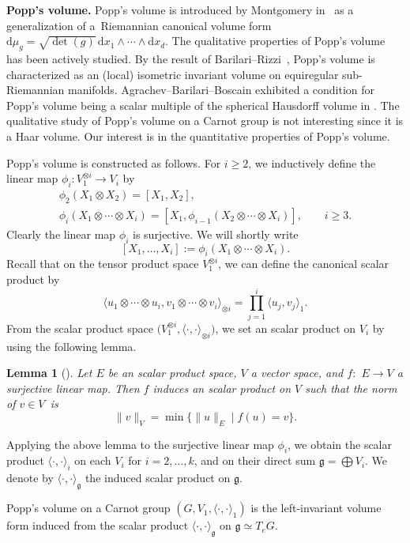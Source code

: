 \documentclass[pdftex]{sigma}
\numberwithin{equation}{section}
\newtheorem{Lemma}[Theorem]{Lemma}
\newcommand{\g}{\mathfrak{g}}
\begin{document}
{\bf Popp's volume.}
Popp's volume is introduced by Montgomery in~\cite{mon} as a gene\-ra\-li\-za\-tion of a~Riemannian canonical volume form $\mathrm{d}\mu_g=\sqrt{\det(g)}\,\mathrm{d}x_1\wedge\cdots\wedge \mathrm{d}x_d$.
The qualitative properties of Popp's volume has been actively studied.
By the result of Barilari--Rizzi~\cite{bar},
Popp's volume is characterized as an (local) isometric invariant volume on equiregular sub-Riemannian manifolds.
Agrachev--Barilari--Boscain exhibited a condition for Popp's volume being a scalar multiple of the spherical Hausdorff volume in \cite{agr2}.
The qualitative study of Popp's volume on a Carnot group is not interesting since it is a Haar volume.
Our interest is in the quantitative properties of Popp's volume.

Popp's volume is constructed as follows.
For $i\geq 2$,
we inductively define the linear map $\phi_i\colon V_1^{\otimes i}\to V_i$ by
\begin{gather*}
\phi_2(X_1\otimes X_2)=[X_1,X_2],
\\
\phi_i(X_1\otimes \cdots \otimes X_i)=[X_1,\phi_{i-1}(X_2\otimes \cdots\otimes X_i)],\qquad i\geq 3.
\end{gather*}
Clearly the linear map $\phi_i$ is surjective.
We will shortly write
\[
[X_1,\dots,X_i]:=\phi_i(X_1\otimes\cdots\otimes X_i).
\]
Recall that on the tensor product space $V_1^{\otimes i}$,
we can define the canonical scalar product by
\[
\langle u_1\otimes\cdots\otimes u_i,v_1\otimes \cdots\otimes v_i\rangle_{\otimes i}=\prod_{j=1}^i\langle u_j,v_j\rangle_1.
\]
From the scalar product space $\big(V_1^{\otimes i},\langle\cdot,\cdot\rangle_{\otimes i}\big)$,
we set an scalar product on $V_i$ by using the following lemma.

\begin{Lemma}[{\cite[Lemma~20.3]{agr}}]
 Let $E$ be an scalar product space,
 $V$ a vector space,
 and $f{:}$ $E\to V$ a surjective linear map.
 Then $f$ induces an scalar product on $V$ such that the norm of $v\in V$~is
 \[
 \|v\|_{V}=\min\{\|u\|_E\mid f(u)=v\}.
 \]
\end{Lemma}

Applying the above lemma to the surjective linear map $\phi_i$,
we obtain the scalar product $\langle\cdot,\cdot\rangle_i$ on each $V_i$ for $i=2,\dots,k$,
and on their direct sum $\g=\bigoplus V_i$.
We denote by $\langle\cdot,\cdot\rangle_{\g}$ the induced scalar product on $\g$.
\begin{Definition}\label{defpopp}
 Popp's volume on a Carnot group $(G,V_1,\langle\cdot,\cdot\rangle_1)$ is the left-invariant volume form induced from the scalar product $\langle\cdot,\cdot\rangle_{\g}$ on $\g\simeq T_eG$.
\end{Definition}
\end{document}
